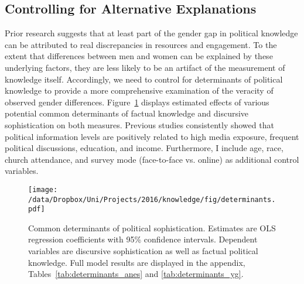\subsection*{Controlling for Alternative Explanations}
Prior research suggests that at least part of the gender gap in political knowledge can be attributed to real discrepancies in resources and engagement. To the extent that differences between men and women can be explained by these underlying factors, they are less likely to be an artifact of the measurement of knowledge itself. Accordingly, we need to control for determinants of political knowledge to provide a more comprehensive examination of the veracity of observed gender differences. Figure~\ref{fig:determinants} displays estimated effects of various potential common determinants of factual knowledge and discursive sophistication on both measures. Previous studies consistently showed that political information levels are positively related to high media exposure, frequent political discussions, education, and income. Furthermore, I include age, race, church attendance, and survey mode (face-to-face vs. online) as additional control variables.

\begin{figure}[h]\centering
\texttt{[image: /data/Dropbox/Uni/Projects/2016/knowledge/fig/determinants.pdf]}
\caption[Common determinants of political sophistication]{Common determinants of political sophistication. Estimates are OLS regression coefficients with 95\% confidence intervals. Dependent variables are discursive sophistication as well as factual political knowledge. Full model results are displayed in the appendix, Tables~\ref{tab:determinants_anes} and \ref{tab:determinants_yg}.}\label{fig:determinants}
\end{figure}

